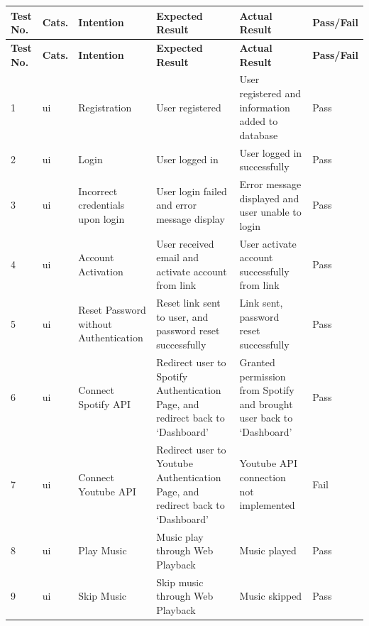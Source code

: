 \begin{landscape}
\setcounter{figure}{0}
\setcounter{table}{0} 
\begin{longtable}{ |m{1cm}|m{1.5cm}|m{5cm}|m{6cm}|m{6cm}|m{2cm}| }
    \hline
    \rowcolor{lightgray}
    \textbf{Test No.} & \textbf{Cats.} & \textbf{Intention} & \textbf{Expected Result} & \textbf{Actual Result} & \textbf{Pass/Fail} \\
    \hline
    \endfirsthead

    \hline
    \rowcolor{lightgray}
    \textbf{Test No.} & \textbf{Cats.} & \textbf{Intention} & \textbf{Expected Result} & \textbf{Actual Result} & \textbf{Pass/Fail} \\
    \hline
    \endhead
    1 & \gls{ui} & Registration & User registered & User registered and information added to database & Pass \\
    \hline
    2 & \gls{ui} & Login & User logged in & User logged in successfully & Pass \\
    \hline
    3 & \gls{ui} & Incorrect credentials upon login & User login failed and error message display & Error message displayed and user unable to login & Pass \\
    \hline
    4 & \gls{ui} & Account Activation & User received email and activate account from link & User activate account successfully from link & Pass \\
    \hline
    5 & \gls{ui} & Reset Password without Authentication & Reset link sent to user, and password reset successfully & Link sent, password reset successfully & Pass \\
    \hline
    6 & \gls{ui} & Connect Spotify API & Redirect user to Spotify Authentication Page, and redirect back to `Dashboard' & Granted permission from Spotify and brought user back to `Dashboard' & Pass \\
    \hline
    7 & \gls{ui} & Connect Youtube API & Redirect user to Youtube Authentication Page, and redirect back to `Dashboard' & Youtube API connection not implemented & Fail \\
    \hline
    8 & \gls{ui} & Play Music & Music play through Web Playback & Music played & Pass \\
    \hline
    9 & \gls{ui} & Skip Music & Skip music through Web Playback & Music skipped & Pass \\

\end{longtable}
\end{landscape}
